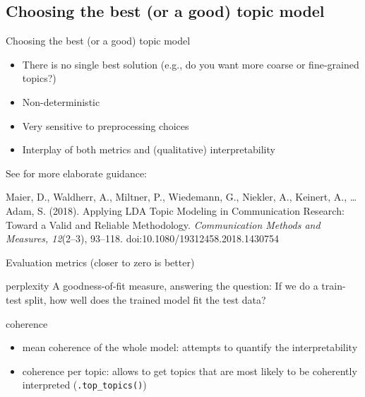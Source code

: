 \documentclass{beamer}
\begin{document}



\subsection{Choosing the best (or a good) topic model}

\begin{frame}{Choosing the best (or a good) topic model}
\begin{itemize}
	\item There is no single best solution (e.g., do you want more coarse or fine-grained topics?)
	\item Non-deterministic
	\item Very sensitive to preprocessing choices
	\item Interplay of both metrics and (qualitative) interpretability 
\end{itemize}

See for more elaborate guidance:

\tiny{Maier, D., Waldherr, A., Miltner, P., Wiedemann, G., Niekler, A., Keinert, A., \ldots Adam, S. (2018). Applying LDA Topic Modeling in Communication Research: Toward a Valid and Reliable Methodology. \textit{Communication Methods and Measures, 12}(2--3), 93--118. doi:10.1080/19312458.2018.1430754}

\end{frame}



\begin{frame}{Evaluation metrics (closer to zero is better)}
\begin{block}{perplexity}
A goodness-of-fit measure, answering the question: If we do a train-test split, how well does the trained model fit the test data?
\end{block}

\pause 
\begin{block}{coherence}
\begin{itemize}
\item mean coherence of the whole model: attempts to quantify the interpretability
\item coherence per topic: allows to get topics that are most likely to be coherently interpreted (\texttt{.top\_topics()})
\end{itemize}
\end{block}

\end{frame}
\end{document}
